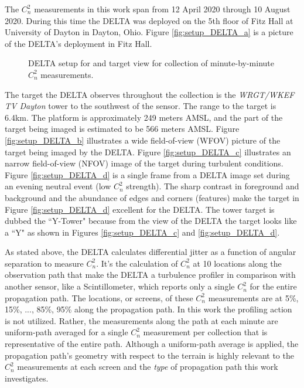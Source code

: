 The $C_{n}^{2}$ measurements in this work span from 12 April 2020 through 10 August 2020. During this time the \ac{DELTA} was deployed on the 5th floor of Fitz Hall at University of Dayton in Dayton, Ohio. Figure \ref{fig:setup_DELTA_a} is a picture of the \ac{DELTA}'s deployment in Fitz Hall.
\begin{figure}[p!]
	\centering
	\hfill
	\hfill
	\caption{DELTA setup for and target view for collection of minute-by-minute $C_{n}^{2}$ measurements.}
	\label{fig:setup_DELTA}
\end{figure}
The target the \ac{DELTA} observes throughout the collection is the \textit{WRGT/WKEF TV Dayton} tower to the southwest of the sensor. The range to the target is 6.4km. The platform is approximately 249 meters \ac{AMSL}, and the part of the target being imaged is estimated to be 566 meters \ac{AMSL}. Figure \ref{fig:setup_DELTA_b} illustrates a wide field-of-view (WFOV) picture of the target being imaged by the \ac{DELTA}. Figure \ref{fig:setup_DELTA_c} illustrates an narrow field-of-view (NFOV) image of the target during  turbulent conditions. Figure \ref{fig:setup_DELTA_d} is a single frame from a \ac{DELTA} image set during an evening neutral event (low $C_{n}^{2}$ strength). The sharp contrast in foreground and background and the abundance of edges and corners (features) make the target in Figure \ref{fig:setup_DELTA_d} excellent for the \ac{DELTA}. The tower target is dubbed the ``Y-Tower" because from the view of the \ac{DELTA} the target looks like a ``Y" as shown in Figures \ref{fig:setup_DELTA_c} and \ref{fig:setup_DELTA_d}.

As stated above, the \ac{DELTA} calculates differential jitter as a function of angular separation to measure $C_{n}^{2}$. It's the calculation of $C_{n}^{2}$ at 10 locations along the observation path that make the \ac{DELTA} a turbulence profiler in comparison with another sensor, like a Scintillometer, which reports only a single $C_{n}^{2}$ for the entire propagation path. The locations, or screens, of these $C_{n}^{2}$ measurements are at 5\%, 15\%, ..., 85\%, 95\% along the propagation path. In this work the profiling action is not utilized. Rather, the measurements along the path at each minute are uniform-path averaged for a single $C_{n}^{2}$ measurement per collection that is representative of the entire path. Although a uniform-path average is applied, the propagation path's geometry with respect to the terrain is highly relevant to the $C_{n}^{2}$ measurements at each screen and the \emph{type} of propagation path this work investigates.

